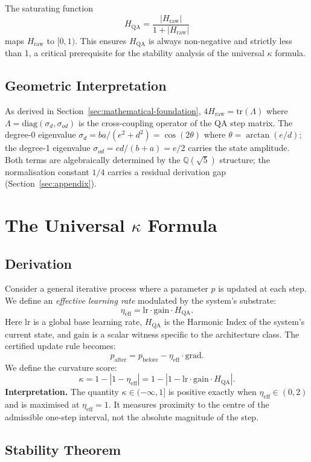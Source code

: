 \documentclass[11pt]{article}
\theoremstyle{definition}
\theoremstyle{remark}
\newcommand{\hqa}{H_{\mathrm{QA}}}
\newcommand{\hraw}{H_{\mathrm{raw}}}
\newcommand{\etaeff}{\eta_{\mathrm{eff}}}
\begin{document}
The saturating function
\[
  \hqa = \frac{|\hraw|}{1 + |\hraw|}
\]
maps $\hraw$ to $[0,1)$. This ensures $\hqa$ is always non-negative and strictly
less than 1, a critical prerequisite for the stability analysis of the universal
$\kappa$ formula.

\subsection{Geometric Interpretation}

As derived in Section~\ref{sec:mathematical-foundation}, $4\hraw=\mathrm{tr}(\Lambda)$
where $\Lambda=\mathrm{diag}(\sigma_d,\sigma_{od})$ is the cross-coupling operator of
the QA step matrix. The degree-0 eigenvalue $\sigma_d=ba/(e^2+d^2)=\cos(2\theta)$
where $\theta=\arctan(e/d)$; the degree-1 eigenvalue $\sigma_{od}=ed/(b+a)=e/2$
carries the state amplitude. Both terms are algebraically determined by the
$\mathbb{Q}(\sqrt{5})$ structure; the normalisation constant $1/4$ carries a residual
derivation gap (Section~\ref{sec:appendix}).

\section{The Universal $\kappa$ Formula}

\subsection{Derivation}

Consider a general iterative process where a parameter $p$ is updated at each step.
We define an \emph{effective learning rate} modulated by the system's substrate:
\[
  \etaeff = \mathrm{lr} \cdot \mathrm{gain} \cdot \hqa.
\]
Here $\mathrm{lr}$ is a global base learning rate, $\hqa$ is the Harmonic Index of
the system's current state, and $\mathrm{gain}$ is a scalar witness specific to the
architecture class. The certified update rule becomes:
\[
  p_{\mathrm{after}} = p_{\mathrm{before}} - \etaeff \cdot \mathrm{grad}.
\]
We define the curvature score:
\[
  \kappa = 1 - |1-\etaeff| = 1 - |1 - \mathrm{lr}\cdot\mathrm{gain}\cdot\hqa|.
\]
\textbf{Interpretation.} The quantity $\kappa\in(-\infty,1]$ is positive exactly
when $\etaeff\in(0,2)$ and is maximised at $\etaeff=1$. It measures proximity to
the centre of the admissible one-step interval, not the absolute magnitude of the
step.

\subsection{Stability Theorem}
\end{document}
